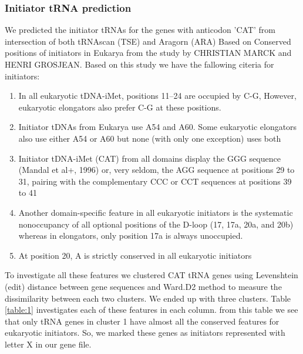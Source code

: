 \documentclass[
10pt, %
a4paper, %
oneside, %
headinclude,footinclude, %
BCOR5mm, %
]{scrartcl}
\begin{document}
\subsubsection{Initiator tRNA prediction}
We predicted the initiator tRNAs for the genes with anticodon 'CAT' from intersection of both tRNAscan (TSE) and Aragorn (ARA) Based on Conserved positions of initiators in Eukarya from the study by CHRISTIAN MARCK and HENRI GROSJEAN. Based on this study we have the fallowing citeria for initiators:
\begin{enumerate}[noitemsep] %
\item In all eukaryotic tDNA-iMet, positions 11–24 are occupied by C-G, However, eukaryotic elongators
also prefer C-G at these positions.

\item Initiator tDNAs from Eukarya use A54 and A60. Some eukaryotic elongators also use either A54 or
A60 but none (with only one exception) uses both

\item Initiator tDNA-iMet (CAT) from all domains display the GGG sequence (Mandal et al+, 1996) or,
very seldom, the AGG sequence at positions 29 to 31, pairing with the complementary CCC or
CCT sequences at positions 39 to 41

\item Another domain-specific feature in all eukaryotic initiators is the systematic nonoccupancy of all
optional positions of the D-loop (17, 17a, 20a, and 20b) whereas in elongators, only position 17a is always unoccupied.

\item At position 20, A is strictly conserved in all eukaryotic initiators
\end{enumerate} 
To investigate all these features we clustered CAT tRNA genes using Levenshtein (edit) distance between gene sequences and Ward.D2 method to measure the dissimilarity between each two clusters. We ended up with three clusters. Table \ref{table:1} investigates each of these features in each column. from this table we see that only tRNA genes in cluster 1 have almost all the conserved features for eukaryotic initiators. So, we marked these genes as initiators represented with letter X in our gene file.
\end{document}
